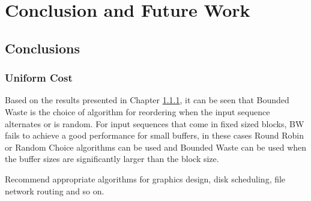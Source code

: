 \chapter{Conclusion and Future Work} \label{conclusion}
\section{Conclusions} \label{section7}

\subsection{Uniform Cost}

Based on the results presented in Chapter \ref{}, it can be seen that Bounded Waste is the choice of algorithm for reordering when the input sequence alternates or is random. For input sequences that come in fixed sized blocks, BW fails to achieve a good performance for small buffers, in these cases Round Robin or Random Choice algorithms can be used and Bounded Waste can be used when the buffer sizes are significantly larger than the block size. 


Recommend appropriate algorithms for graphics design, disk scheduling, file
network routing and so on.
